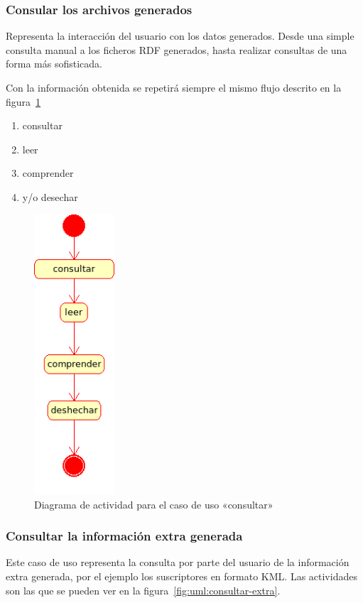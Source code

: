 \subsubsection{Consular los archivos generados}

Representa la interacción del usuario con los datos generados. Desde una 
simple consulta manual a los ficheros RDF generados, hasta realizar 
consultas de una forma más sofisticada.

Con la información obtenida se repetirá siempre el mismo flujo descrito en
la figura~\ref{fig:uml:consultar}

\begin{enumerate}
 \item consultar
 \item leer
 \item comprender
 \item y/o desechar
\end{enumerate}

\begin{figure}[ht]
 	\centering
	\includegraphics[width=3cm]{images/uml/casos-uso/consultar.png}
	\caption{Diagrama de actividad para el caso de uso «consultar»}
	\label{fig:uml:consultar}
\end{figure}

\subsubsection{Consultar la información extra generada}

Este caso de uso representa la consulta por parte del usuario de la 
información extra generada, por el ejemplo los suscriptores en formato 
KML. Las actividades son las que se pueden ver en la 
figura~\ref{fig:uml:consultar-extra}.

